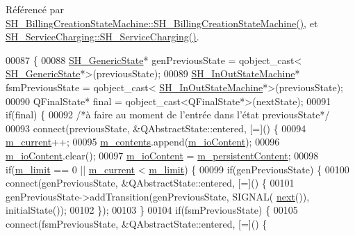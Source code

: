 Référencé par \hyperlink{classSH__BillingCreationStateMachine_ad62b77fa4aeafe200056ff3974562f83}{S\-H\-\_\-\-Billing\-Creation\-State\-Machine\-::\-S\-H\-\_\-\-Billing\-Creation\-State\-Machine()}, et \hyperlink{classSH__ServiceCharging_afa5273d046049b1c2b020a6a19a8290b}{S\-H\-\_\-\-Service\-Charging\-::\-S\-H\-\_\-\-Service\-Charging()}.


\begin{DoxyCode}
00087 \{
00088     \hyperlink{classSH__GenericState}{SH\_GenericState}* genPreviousState = qobject\_cast<
      \hyperlink{classSH__GenericState}{SH\_GenericState}*>(previousState);
00089     \hyperlink{classSH__InOutStateMachine}{SH\_InOutStateMachine}* fsmPreviousState = qobject\_cast<
      \hyperlink{classSH__InOutStateMachine}{SH\_InOutStateMachine}*>(previousState);
00090     QFinalState* \textcolor{keyword}{final} = qobject\_cast<QFinalState*>(nextState);
00091     \textcolor{keywordflow}{if}(\textcolor{keyword}{final}) \{
00092         \textcolor{comment}{/*à faire au moment de l'entrée dans l'état previousState*/}
00093         connect(previousState, &QAbstractState::entered, [=]() \{
00094             \hyperlink{classSh__LoopingInOutStateMachine_a6bcf7bcfe684dbd4d11ed327948e161b}{m\_current}++;
00095             \hyperlink{classSh__LoopingInOutStateMachine_a267e7cbcb3d6a137e2a4e1f93fb57e68}{m\_contents}.append(\hyperlink{classSH__InOutStateMachine_a661a1c7bd3b1086b3b5cd60ca957ecbd}{m\_ioContent});
00096             \hyperlink{classSH__InOutStateMachine_a661a1c7bd3b1086b3b5cd60ca957ecbd}{m\_ioContent}.clear();
00097             \hyperlink{classSH__InOutStateMachine_a661a1c7bd3b1086b3b5cd60ca957ecbd}{m\_ioContent} = \hyperlink{classSh__LoopingInOutStateMachine_ad9c0db5b057a6ba340ffcaddce60d6da}{m\_persistentContent};
00098             \textcolor{keywordflow}{if}(\hyperlink{classSh__LoopingInOutStateMachine_a320ece6cf74c2667c70059b9421117fb}{m\_limit} == 0 || \hyperlink{classSh__LoopingInOutStateMachine_a6bcf7bcfe684dbd4d11ed327948e161b}{m\_current} < \hyperlink{classSh__LoopingInOutStateMachine_a320ece6cf74c2667c70059b9421117fb}{m\_limit}) \{
00099                 \textcolor{keywordflow}{if}(genPreviousState) \{
00100                     connect(genPreviousState, &QAbstractState::entered, [=]() \{
00101                         genPreviousState->addTransition(genPreviousState, SIGNAL(
      \hyperlink{classSH__InOutStateMachine_aa9ee51efe0e17dcf5366c8a97b523892}{next}()), initialState());
00102                     \});
00103                 \}
00104                 \textcolor{keywordflow}{if}(fsmPreviousState) \{
00105                     connect(fsmPreviousState, &QAbstractState::entered, [=]() \{

\end{DoxyCode}
